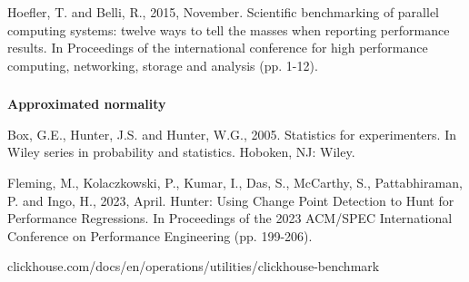 \documentclass[usenames,dvipsnames, 18pt, compress, aspectratio=169]{beamer}
\begin{document}
\begin{frame}
    \frametitle{}
    \begin{center}
    \end{center}

    \linespread{0.5}
    \vspace{0.5cm}
    \color{black}\fontsize{6pt}{0}\selectfont
        Hoefler, T. and Belli, R., 2015, November. Scientific benchmarking of
        parallel computing systems: twelve ways to tell the masses when
        reporting performance results. In Proceedings of the international
        conference for high performance computing, networking, storage and
        analysis (pp. 1-12).
    \linespread{1.5}

\end{frame}

\begin{frame}
    \frametitle{}
    \begin{center}
        \textbf{Approximated normality}
    \end{center}

    \linespread{0.5}
    \vspace{0.5cm}
    \color{black}\fontsize{10pt}{0}\selectfont
        Box, G.E., Hunter, J.S. and Hunter, W.G., 2005. Statistics for
        experimenters. In Wiley series in probability and statistics. Hoboken,
        NJ: Wiley.

    \color{black}\fontsize{10pt}{0}\selectfont
        Fleming, M., Kolaczkowski, P., Kumar, I., Das, S., McCarthy, S.,
        Pattabhiraman, P. and Ingo, H., 2023, April. Hunter: Using Change Point
        Detection to Hunt for Performance Regressions. In Proceedings of the
        2023 ACM/SPEC International Conference on Performance Engineering (pp.
        199-206).

    \color{black}\fontsize{10pt}{0}\selectfont
        clickhouse.com/docs/en/operations/utilities/clickhouse-benchmark

    \linespread{1.5}

\end{frame}
\end{document}
